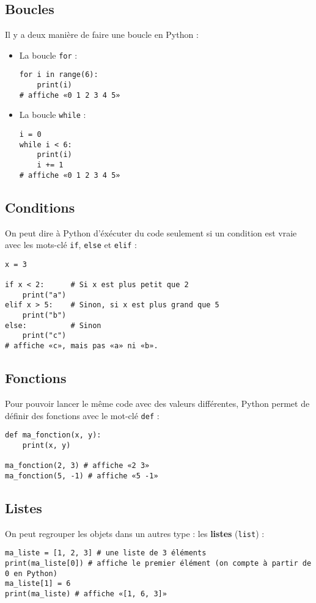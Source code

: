 \documentclass[
	classe=$2^{de}$,
	headerTitle=Fiche\space récapitulative
]
{informatique}
\begin{document}
\subsection*{Boucles}

Il y a deux manière de faire une boucle en Python :
\begin{itemize}
	\item La boucle \texttt{for} :
	      \begin{lstlisting}
for i in range(6):
    print(i)
# affiche «0 1 2 3 4 5»
	      \end{lstlisting}
	\item La boucle \texttt{while} :
	      \begin{lstlisting}
i = 0
while i < 6:
    print(i)
	i += 1
# affiche «0 1 2 3 4 5»
		  \end{lstlisting}
\end{itemize}

\subsection*{Conditions}

On peut dire à Python d'éxécuter du code seulement si un condition est vraie avec les mots-clé \texttt{if}, \texttt{else} et \texttt{elif} :
\begin{lstlisting}
x = 3

if x < 2:      # Si x est plus petit que 2
	print("a")
elif x > 5:    # Sinon, si x est plus grand que 5
	print("b")
else:          # Sinon
	print("c")
# affiche «c», mais pas «a» ni «b».
\end{lstlisting}

\subsection*{Fonctions}

Pour pouvoir lancer le même code avec des valeurs différentes, Python permet de définir des fonctions avec le mot-clé \texttt{def} :

\begin{lstlisting}
def ma_fonction(x, y):
    print(x, y)

ma_fonction(2, 3) # affiche «2 3»
ma_fonction(5, -1) # affiche «5 -1»
\end{lstlisting}

\subsection*{Listes}

On peut regrouper les objets dans un autres type : les \textbf{listes} (\texttt{list}) :
\begin{lstlisting}
ma_liste = [1, 2, 3] # une liste de 3 éléments
print(ma_liste[0]) # affiche le premier élément (on compte à partir de 0 en Python)
ma_liste[1] = 6
print(ma_liste) # affiche «[1, 6, 3]»
\end{lstlisting}
\end{document}
